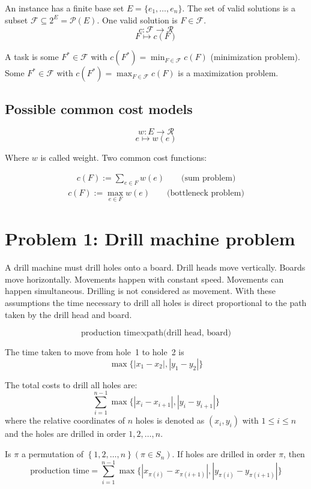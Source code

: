 \documentclass{article}
\newcommand{\set}[1]{\left\{#1\right\}}
\begin{document}
An instance has a finite base set $E = \{e_1, \ldots, e_n\}$.
The set of valid solutions is a subset $\mathcal{F} \subseteq 2^E = \mathcal{P}(E)$.
One valid solution is $F \in \mathcal{F}$.
\[
    c : \mathcal{F} \rightarrow \mathcal{R}
\] \[
    F \mapsto c(F)
\]

A task is some $F^* \in \mathcal{F}$ with $c(F^*) = \min_{F \in \mathcal{F}} c(F)$
(minimization problem). Some $F^* \in \mathcal{F}$ with $c(F^*) = \max_{F \in \mathcal{F}} c(F)$
is a maximization problem.

\subsection{Possible common cost models}
%
\[
    w: E \rightarrow \mathcal{R}
\] \[
    e \mapsto w(e)
\]

Where $w$ is called weight. Two common cost functions:

\begin{align}
    c(F) := \sum_{e \in F} w(e)  \qquad \text{(sum problem)}
\end{align}
\begin{align}
    c(F) := \max_{e \in F} w(e)  \qquad \text{(bottleneck problem)}
\end{align}

\section{Problem 1: Drill machine problem}
%
A drill machine must drill holes onto a board. Drill heads move vertically. Boards move horizontally. Movements happen with constant speed. Movements can happen simultaneous. Drilling is not considered as movement. With these assumptions the time necessary to drill all holes is direct proportional to the path taken by the drill head and board.

\[
    \text{production time} \propto \text{path(drill head, board)}
\]

The time taken to move from hole~1 to hole~2 is
\[
    \max\{|x_1 - x_2|, |y_1 - y_2|\}
\]

The total costs to drill all holes are:
\[
    \sum_{i=1}^{n-1} \max\{|x_i - x_{i+1}|, |y_i - y_{i+1}|\}
\]
where the relative coordinates of $n$ holes is denoted as $(x_i, y_i)$ with $1 \leq i \leq n$ and the holes are drilled in order $1, 2, \ldots, n$.

Is $\pi$ a permutation of $\set{1, 2, \ldots, n} (\pi \in S_n)$. If holes are drilled in order $\pi$, then
\[
    \text{production time} = \sum_{i=1}^{n-1} \max\{|x_{\pi(i)} - x_{\pi(i+1)}|, |y_{\pi(i)} - y_{\pi(i+1)}|\}
\]
\end{document}

